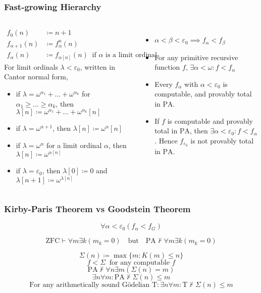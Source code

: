 \documentclass[UTF8,11pt,colorlinks,compress,openany]{beamer}%
\begin{document}
\begin{frame}\frametitle{Fast-growing Hierarchy}
\setlength\abovedisplayskip{0pt}
	\begin{columns}[onlytextwidth]
			\begin{definition}
				\begin{align*}
				f_{0}(n)&\coloneqq n+1\\
				f_{{\alpha +1}}(n)&\coloneqq f_{\alpha }^{n}(n)\\
				f_{\alpha }(n)&\coloneqq f_{{\alpha [n]}}(n)\;\;\text{if $\alpha$ is a limit ordinal.}
				\end{align*}
				For limit ordinals $\lambda<\varepsilon_0$, written in Cantor normal form,
				\begin{itemize}
					\item if $\lambda=\omega^{\alpha_1}+\dots+\omega^{\alpha_k}$ for $\alpha_1\geq\dots\geq\alpha_k$, then $\lambda[n]\coloneqq \omega^{\alpha_1}+\dots+\omega^{\alpha_k}[n]$
					\item if $\lambda=\omega^{\alpha+1}$, then $\lambda[n]\coloneqq \omega^\alpha[n]$
					\item if $\lambda=\omega^\alpha$ for a limit ordinal $\alpha$, then $\lambda[n]\coloneqq \omega^{\alpha[n]}$
					\item if $\lambda=\varepsilon_0$, then $\lambda[0]\coloneqq 0$ and $\lambda[n+1]\coloneqq \omega^{\lambda[n]}$
				\end{itemize}
			\end{definition}
			\begin{itemize}
				\item $\alpha<\beta<\varepsilon_0\implies f_\alpha<f_\beta$
				\item For any primitive recursive function $f$, $\exists\alpha<\omega: f<f_\alpha$
				\item Every $f_\alpha$ with $\alpha<\varepsilon_0$ is computable, and provably total in $\mathrm{PA} $.
				\item If $f$ is computable and provably total in $\mathrm{PA} $, then $\exists\alpha<\varepsilon_0: f<f_\alpha$. Hence $f_{\varepsilon_0}$ is not provably total in $\mathrm{PA} $.
			\end{itemize}
	\end{columns}
\end{frame}

\begin{frame}\frametitle{Kirby-Paris Theorem vs Goodstein Theorem}
	\begin{theorem}
		\[\forall \alpha<\varepsilon_0\left(f_\alpha<f_G\right)\]
	\end{theorem}
	\begin{block}{}
		\[\mathrm{ZFC}\vdash\forall m\exists k(m_k=0)\quad
		\text{but}\quad \mathrm{PA} \nvdash\forall m\exists k(m_k=0)\]
	\end{block}
	\[\Sigma(n)\coloneqq \max\{m: K(m)\leq n\}\]
	\[f<\Sigma\;\;\text{for any computable $f$}\]
	\[\mathrm{PA} \nvdash\forall n\exists m(\Sigma(n)=m)\]
	\[\exists n\forall m: \mathrm{PA} \nvdash\Sigma(n)\leq m\]
	\[\text{For any arithmetically sound G\"odelian $\mathrm{T}$}: \exists n\forall m: \mathrm{T}\nvdash\Sigma(n)\leq m\]
\end{frame}
\end{document}
